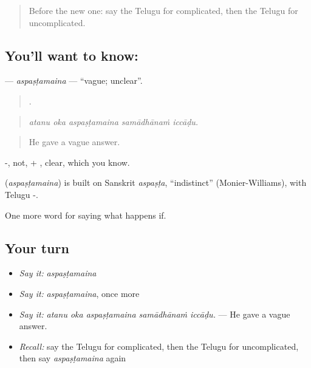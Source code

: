 \label{lesson:TE-C437-aspastamaina}



\begin{quote}
Before the new one: say the Telugu for complicated, then the Telugu for uncomplicated.
\end{quote}

\subsection*{You'll want to know: }
\textbf{} — \emph{aspaṣṭamaina} — \textquotedblleft{}vague; unclear\textquotedblright{}.

\begin{quote}
    .
\end{quote}

\begin{quote}
\emph{atanu oka aspaṣṭamaina samādhānaṁ iccāḍu.}
\end{quote}

\begin{quote}
He gave a vague answer.
\end{quote}

-, not, + , clear, which you know.

\begin{cousinweb}
\textbf{} (\emph{aspaṣṭamaina}) is built on Sanskrit \emph{aspaṣṭa}, \textquotedblleft{}indistinct\textquotedblright{} (Monier-Williams), with Telugu -.
\end{cousinweb}

\begin{grammarlens}[title={What you've built}]
One more word for saying what happens if.
\end{grammarlens}

\subsection*{Your turn}
\begin{itemize}
\raggedright
  \item \emph{Say it:} \emph{aspaṣṭamaina}
  \item \emph{Say it:} \emph{aspaṣṭamaina}, once more
  \item \emph{Say it:} \emph{atanu oka aspaṣṭamaina samādhānaṁ iccāḍu.} — He gave a vague answer.
  \item \emph{Recall:} say the Telugu for complicated, then the Telugu for uncomplicated, then say \emph{aspaṣṭamaina} again
\end{itemize}

